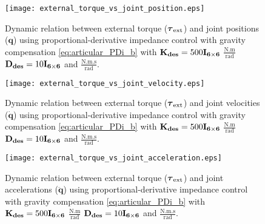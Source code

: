 \begin{figure}
\centering
\texttt{[image: external\_torque\_vs\_joint\_position.eps]}
\caption{Dynamic relation between external torque ($\boldsymbol{\tau}_\mathrm{ext}$) and joint positions ($\mathbf{q}$) using proportional-derivative impedance control with gravity compensation \eqref{eq:articular_PDi_b} with $\mathbf{K_{des}}=500\mathbf{I_{6 \times 6}}$ $\mathrm{\frac{N.m}{rad}}$ $\mathbf{D_{des}}=10\mathbf{I_{6 \times 6}}$ and $\mathrm{\frac{N.m.s}{rad}}$.}
\label{fig:act1.2_tau_vs_q}
\end{figure}

\begin{figure}
\centering
\texttt{[image: external\_torque\_vs\_joint\_velocity.eps]}
\caption{Dynamic relation between external torque ($\boldsymbol{\tau}_\mathrm{ext}$) and joint velocities ($\mathbf{\dot{q}}$) using proportional-derivative impedance control with gravity compensation \eqref{eq:articular_PDi_b} with $\mathbf{K_{des}}=500\mathbf{I_{6 \times 6}}$ $\mathrm{\frac{N.m}{rad}}$ $\mathbf{D_{des}}=10\mathbf{I_{6 \times 6}}$ and $\mathrm{\frac{N.m.s}{rad}}$.}
\label{fig:act1.2_tau_vs_dq}
\end{figure}

\begin{figure}
\centering
\texttt{[image: external\_torque\_vs\_joint\_acceleration.eps]}
\caption{Dynamic relation between external torque ($\boldsymbol{\tau}_\mathrm{ext}$) and joint accelerations ($\mathbf{\ddot{q}}$) using proportional-derivative impedance control with gravity compensation \eqref{eq:articular_PDi_b} with $\mathbf{K_{des}}=500\mathbf{I_{6 \times 6}}$ $\mathrm{\frac{N.m}{rad}}$ $\mathbf{D_{des}}=10\mathbf{I_{6 \times 6}}$ and $\mathrm{\frac{N.m.s}{rad}}$.}
\label{fig:act1.2_tau_vs_ddq}
\end{figure}
